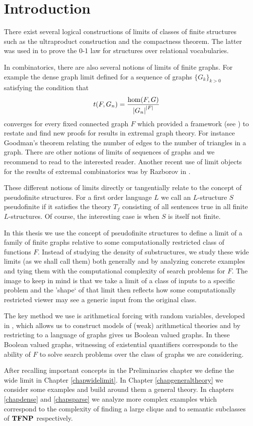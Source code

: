 \chapter*{Introduction}

There exist several logical constructions of limits of classes of finite structures such as the ultraproduct construction and the compactness theorem. The latter was used in \cite{Fagin1976} to prove the 0-1 law for structures over relational vocabularies.

In combinatorics, there are also several notions of limits of finite graphs. For example the dense graph limit defined for a sequence of graphs $\{G_k\}_{k>0}$ satisfying the condition that
\[t(F,G_n)=\frac{\hom(F,G)}{\left|{G_n}\right|^{\left|{F}\right|}}\]
converges for every fixed connected graph $F$ which provided a framework (see \cite{lovasz2006limits}) to restate and find new proofs for results in extremal graph theory. For instance Goodman's theorem relating the number of edges to the number of triangles in a graph. There are other notions of limits of sequences of graphs and we recommend to read \cite{Nesetril2013} to the interested reader. Another recent use of limit objects for the results of extremal combinatorics was by Razborov in \cite{razborov2007flag}.

These different notions of limits directly or tangentially relate to the concept of pseudofinite structures. For a first order language $L$ we call an $L$-structure $S$ pseudofinite if it satisfies the theory $T_f$ consisting of all sentences true in all finite $L$-structures. Of course, the interesting case is when $S$ is itself not finite.

In this thesis we use the concept of pseudofinite structures to define a limit of a family of finite graphs relative to some computationally restricted class of functions $F$. Instead of studying the density of substructures, we study these wide limits (as we shall call them) both generally and by analyzing concrete examples and tying them with the computational complexity of search problems for $F$. The image to keep in mind is that we take a limit of a class of inputs to a specific problem and the 'shape` of that limit then reflects how some computationally restricted viewer may see a generic input from the original class.

The key method we use is arithmetical forcing with random variables, developed in \cite{krajicek2010forcing}, which allows us to construct models of (weak) arithmetical theories and by restricting to a language of graphs gives us Boolean valued graphs. In these Boolean valued graphs, witnessing of existential quantifiers corresponds to the ability of $F$ to solve search problems over the class of graphs we are considering.

After recalling important concepts in the Preliminaries chapter we define the wide limit in Chapter \ref{chapwidelimit}. In Chapter \ref{chapgeneraltheory} we consider some examples and build around them a general theory. In chapters \ref{chapdense} and \ref{chapsparse} we analyze more complex examples which correspond to the complexity of finding a large clique and to semantic subclasses of $\textbf{TFNP}$ respectively. 
